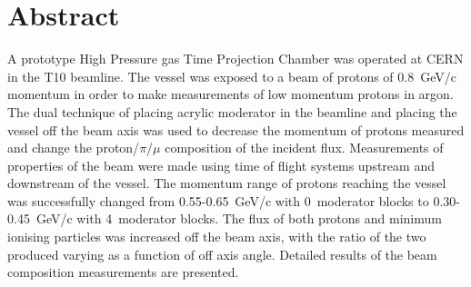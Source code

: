 \section{Abstract}

A prototype High Pressure gas Time Projection Chamber was operated at CERN in the T10 beamline. The vessel was exposed to a beam of protons of 0.8~GeV/c momentum in order to make measurements of low momentum protons in argon.
The dual technique of placing acrylic moderator in the beamline and placing the vessel off the beam axis was used to decrease the momentum of protons measured and change the proton/$\pi$/$\mu$ composition of the incident flux.
Measurements of properties of the beam were made using time of flight systems upstream and downstream of the vessel. The momentum range of protons reaching the vessel was successfully changed from 0.55-0.65~GeV/c with 0~moderator blocks to 0.30-0.45~GeV/c with 4~moderator blocks.
The flux of both protons and minimum ionising particles was increased off the beam axis, with the ratio of the two produced varying as a function of off axis angle. Detailed results of the beam composition measurements are presented.

